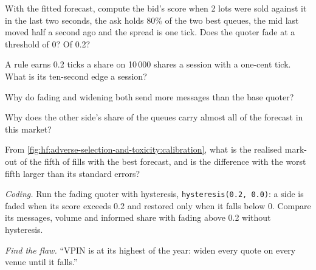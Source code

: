 \begin{exercise}[$\star$]\label{exo:hf:adverse-selection-and-toxicity:2}
With the fitted forecast, compute the bid's score when 2 lots were sold against it in the last two seconds, the ask holds 80\% of the two best
queues, the mid last moved half a second ago and the spread is one tick. Does the quoter fade at a threshold of 0? Of 0.2?
\end{exercise}

\begin{exercise}[$\star$]\label{exo:hf:adverse-selection-and-toxicity:3}
A rule earns 0.2 ticks a share on 10\,000 shares a session with a one-cent tick. What is its ten-second edge a session?
\end{exercise}

\begin{exercise}[$\star\star$]\label{exo:hf:adverse-selection-and-toxicity:4}
Why do fading and widening both send more messages than the base quoter?
\end{exercise}

\begin{exercise}[$\star\star$]\label{exo:hf:adverse-selection-and-toxicity:5}
Why does the other side's share of the queues carry almost all of the forecast in this market?
\end{exercise}

\begin{exercise}[$\star\star$]\label{exo:hf:adverse-selection-and-toxicity:6}
From \cref{fig:hf:adverse-selection-and-toxicity:calibration}, what is the realised mark-out of the fifth of fills with the best forecast, and is
the difference with the worst fifth larger than its standard errors?
\end{exercise}

\begin{exercise}[$\star\star\star$]\label{exo:hf:adverse-selection-and-toxicity:7}
\emph{Coding.} Run the fading quoter with hysteresis, \texttt{hysteresis(0.2, 0.0)}: a side is faded when its score exceeds 0.2 and restored only
when it falls below 0. Compare its messages, volume and informed share with fading above 0.2 without hysteresis.
\end{exercise}

\begin{exercise}[$\star\star\star$]\label{exo:hf:adverse-selection-and-toxicity:8}
\emph{Find the flaw.} ``VPIN is at its highest of the year: widen every quote on every venue until it falls.''
\end{exercise}

